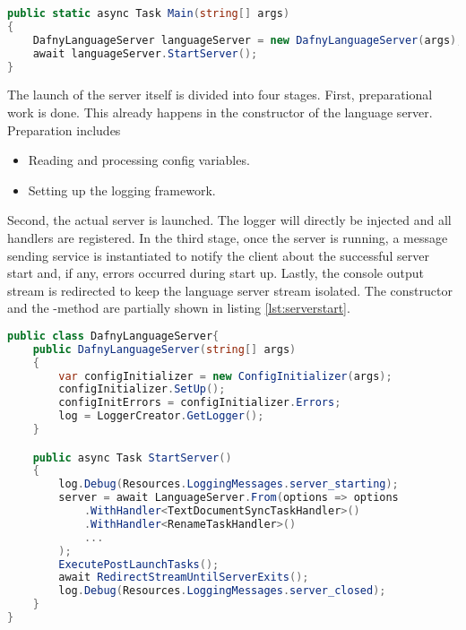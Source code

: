 \begin{lstlisting}[language=csharp, caption={Main Function}, captionpos=b, label={lst:mainserver}]
public static async Task Main(string[] args)
{
    DafnyLanguageServer languageServer = new DafnyLanguageServer(args);
    await languageServer.StartServer();
}
\end{lstlisting}

The launch of the server itself is divided into four stages.
First, preparational work is done.
This already happens in the constructor of the language server.
Preparation includes
\begin{itemize}
    \item Reading and processing config variables.
    \item Setting up the logging framework.
\end{itemize}
Second, the actual server is launched.
The logger will directly be injected and all handlers are registered.
In the third stage, once the server is running, a message sending service is instantiated to notify the client about the successful server start and, if any, errors occurred during start up.
Lastly, the console output stream is redirected to keep the language server stream isolated.
The constructor and the -method are partially shown in listing \ref{lst:serverstart}.

\begin{lstlisting}[language=csharp, caption={Starting the Language Server}, captionpos=b, label={lst:serverstart}]
public class DafnyLanguageServer{
    public DafnyLanguageServer(string[] args)
    {
        var configInitializer = new ConfigInitializer(args);
        configInitializer.SetUp();
        configInitErrors = configInitializer.Errors;
        log = LoggerCreator.GetLogger();
    }

    public async Task StartServer()
    {
        log.Debug(Resources.LoggingMessages.server_starting);
        server = await LanguageServer.From(options => options
            .WithHandler<TextDocumentSyncTaskHandler>()
            .WithHandler<RenameTaskHandler>()
            ...
        );
        ExecutePostLaunchTasks();
        await RedirectStreamUntilServerExits();
        log.Debug(Resources.LoggingMessages.server_closed);
    }
}
\end{lstlisting}

